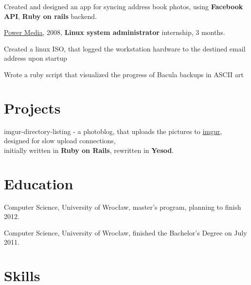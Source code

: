 \documentclass[letterpaper]{article}
\renewenvironment{itemize}{
  \begin{list}{}{
    \setlength{\leftmargin}{1.5em}
  }
}{
  \end{list}
}
\begin{document}
\begin{itemize}
\begin{itemize}
			\item Created and designed an app for syncing address book photos,
                using {\bf Facebook API}, {\bf Ruby on rails} backend.

		\end{itemize}

    \item \href{http://power.com.pl}{Power Media}, 2008, {\bf Linux system administrator} internship, 3 months.
	    \begin{itemize}

		\item Created a linux ISO, that logged the workstation hardware to the destined email address upon startup

		\item Wrote a ruby script that visualized the progress of Bacula backups in ASCII art

	    \end{itemize}
\end{itemize}

\section*{Projects}
\begin{itemize}
    \item imgur-directory-listing - a photoblog, that uploads the pictures to \href{http://imgur.com}{imgur},
        designed for slow upload connections,\\ initially written in {\bf Ruby on Rails}, rewritten in {\bf Yesod}.
\end{itemize}

\section*{Education}

\begin{itemize}
  	\item Computer Science, University of Wrocław, master's program, planning to finish 2012.
  	\item Computer Science, University of Wrocław, finished the Bachelor's Degree on July 2011.
\end{itemize}

\section*{Skills}
\end{document}

